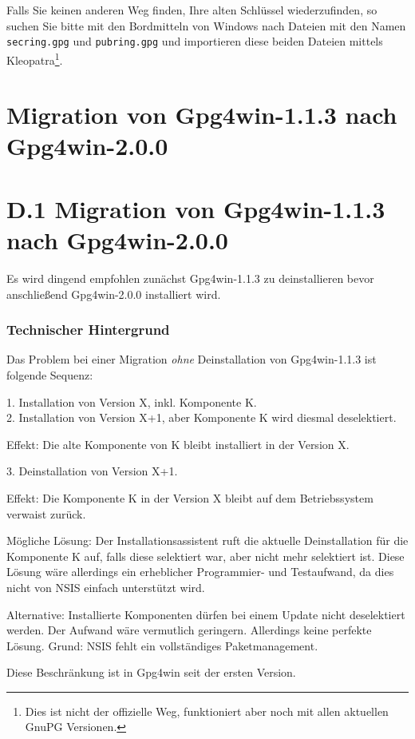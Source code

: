\documentclass[a4paper,11pt, oneside,openright,titlepage,dvips]{scrbook}
\newcommand{\Filename}[1]{\texttt{#1}}
\newcounter{chapter}
\newcounter{section}[chapter]
\begin{document}
Falls Sie keinen anderen Weg finden, Ihre alten Schlüssel
wiederzufinden, so suchen Sie bitte mit den Bordmitteln von Windows
nach Dateien mit den Namen \Filename{secring.gpg} und
\Filename{pubring.gpg} und importieren diese beiden Dateien mittels
Kleopatra\footnote{Dies ist nicht der offizielle Weg, funktioniert aber
noch mit allen aktuellen GnuPG Versionen.}.

\clearpage
\T\section*{Migration von Gpg4win-1.1.3 nach Gpg4win-2.0.0}
\W\section*{D.1 Migration von Gpg4win-1.1.3 nach Gpg4win-2.0.0}

Es wird dingend empfohlen zunächst Gpg4win-1.1.3 zu deinstallieren
bevor anschließend Gpg4win-2.0.0 installiert wird.

\subsubsection{Technischer Hintergrund}
Das Problem bei einer Migration \textit{ohne} Deinstallation von
Gpg4win-1.1.3 ist folgende Sequenz:

1. Installation von Version X, inkl. Komponente K.\\
2. Installation von Version X+1, aber Komponente K wird diesmal deselektiert.

Effekt: Die alte Komponente von K bleibt installiert in der Version X.

3. Deinstallation von Version X+1.

Effekt: Die Komponente K in der Version X bleibt auf dem Betriebssystem verwaist
zurück.

Mögliche Lösung: 
Der Installationsassistent ruft die aktuelle Deinstallation für die Komponente K auf, falls
diese selektiert war, aber nicht mehr selektiert ist.
Diese Lösung wäre allerdings ein erheblicher Programmier- und Testaufwand,
da dies nicht von NSIS einfach unterstützt wird.

Alternative:
Installierte Komponenten dürfen bei einem Update nicht deselektiert
werden. Der Aufwand wäre vermutlich geringern.
Allerdings keine perfekte Lösung. Grund: NSIS fehlt ein vollständiges
Paketmanagement.

Diese Beschränkung ist in Gpg4win seit der ersten Version.
\end{document}
